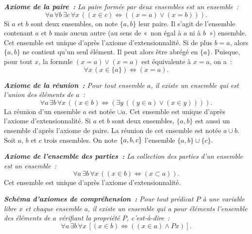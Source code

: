 \noindent\textit{\textbf{Axiome de la paire :} La paire formée par deux ensembles est un ensemble :}
\begin{equation*}
    \forall a \, \forall b \, \exists c \, \forall x \, (
        (x \in c) \Leftrightarrow ((x = a) \vee (x = b))
    ).
\end{equation*}
Si $a$ et $b$ sont deux ensembles, on note $\lbrace a, b \rbrace$ leur paire. 
Il s'agit de l'ensemble contenant $a$ et $b$ mais aucun autre (au sens de « non égal à $a$ ni à $b$ ») ensemble. 
Cet ensemble est unique d'après l'axiome d'extensionnalité.
Si de plus $b = a$, alors $\lbrace a, b \rbrace$ ne contient qu'un seul élément. 
Il peut alors être abrégé en $\lbrace a \rbrace$. 
Puisque, pour tout $x$, la formule $(x = a) \vee (x=a)$ est équivalente à $x = a$, on a : 
\begin{equation*}
    \forall x \, (x \in \lbrace a \rbrace) \Leftrightarrow (x = a). 
\end{equation*}

\medskip

\noindent\textit{\textbf{Axiome de la réunion :} Pour tout ensemble $a$, il existe un ensemble qui est l'union des éléments de $a$ :}
\begin{equation*}
    \forall a \, \exists b \, \forall x \, (
        (x \in b) \Leftrightarrow (\exists y \, ((y \in a) \vee (x \in y)))
    ).
\end{equation*}
La réunion d'un ensemble $a$ est notée $\cup a$.
Cet ensemble est unique d'après l'axiome d'extensionnalité.
Si $a$ et $b$ sont deux ensembles, $\lbrace a, b \rbrace$ est aussi un ensemble d'après l'axiome de paire. 
La réunion de cet ensemble est notée $a \cup b$. 
Soit $a$, $b$ et $c$ trois ensembles. 
On note $\left\lbrace a, b, c \right\rbrace$ l'ensemble $\lbrace a, b \rbrace \cup \lbrace c \rbrace$. 

\medskip

\noindent\textit{\textbf{Axiome de l'ensemble des parties :} La collection des parties d'un ensemble est un ensemble :} 
\begin{equation*}
    \forall a \, \exists b \, \forall x \, (
        (x \in b) \Leftrightarrow (x \subset a)
    ).
\end{equation*}
Cet ensemble est unique d'après l'axiome d'extensionnalité.

\medskip

\noindent\textit{\textbf{Schéma d'axiomes de compréhension :} 
Pour tout prédicat $P$ à une variable libre $x$ et chaque ensemble $a$, il existe un ensemble qui a pour éléments l'ensemble des éléments de $a$ vérifiant la propriété $P$, c'est-à-dire :}
\begin{equation*}
\forall a \, \exists b \, \forall x \, [ (x \in b) \Leftrightarrow ((x \in a) \wedge P x)]. 
\end{equation*}

